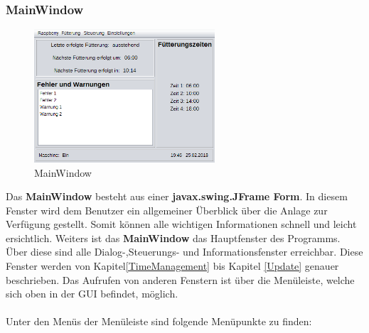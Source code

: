 \subsubsection{MainWindow}\label{subsubsec:MainWindow}
\begin{figure}
\vspace{-20pt}
  \begin{center}
    \includegraphics[width=0.60\textwidth]{Bilder/GUI/MainWindow}
  \end{center}
  \caption{MainWindow}
  \label{MainWindow}
  \vspace{-10pt}
\end{figure}
Das \textbf{MainWindow} besteht aus einer \textbf{javax.swing.JFrame Form}. In diesem Fenster wird dem Benutzer ein allgemeiner Überblick über die Anlage zur Verfügung gestellt. Somit können alle wichtigen Informationen schnell und leicht ersichtlich. Weiters ist das \textbf{MainWindow} das Hauptfenster des Programms. Über diese sind alle Dialog-,Steuerungs- und Informationsfenster erreichbar. Diese Fenster werden von Kapitel\ref{TimeManagement} bis Kapitel \ref{Update} genauer beschrieben. Das Aufrufen von anderen Fenstern ist über die Menüleiste, welche sich oben in der GUI befindet, möglich. 
\\ \\ Unter den Menüs der Menüleiste sind folgende Menüpunkte zu finden:
